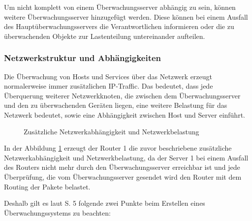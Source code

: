 Um nicht komplett von einem Überwachungsserver abhängig zu sein, können weitere Überwachungsserver hinzugefügt werden.
Diese können bei einem Ausfall des Hauptüberwachungsservers die Verantwortlichen informieren oder die zu überwachenden Objekte zur Lastenteilung untereinander aufteilen.



\subsubsection{Netzwerkstruktur und Abhängigkeiten}
Die Überwachung von Hosts und Services über das Netzwerk erzeugt normalerweise immer zusätzlichen \gls{IP}-Traffic.
Das bedeutet, dass jede Überquerung weiterer Netzwerkknoten, die zwischen dem Überwachungsserver und den zu überwachenden Geräten liegen, eine weitere Belastung für das Netzwerk bedeutet, sowie eine Abhängigkeit zwischen Host und Server einführt.
\newpage
\begin{figure}[ht]
	\centering
		\caption[Zusätzliche Netzwerkabhängigkeit und Netzwerkbelastung]{Zusätzliche Netzwerkabhängigkeit und Netzwerkbelastung}
		\label{depend}
\end{figure}

In der Abbildung \ref{depend} erzeugt der Router 1 die zuvor beschriebene zusätzliche Netzwerkabhängigkeit und Netzwerkbelastung, da der Server 1 bei einem Ausfall des Routers nicht mehr durch den Überwachungsserver erreichbar ist und jede Überprüfung, die vom Überwachungsserver gesendet wird den Router mit dem Routing der Pakete belastet.

Deshalb gilt es laut \cite{Jose07} S. 5 folgende zwei Punkte beim Erstellen eines Überwachungssystems zu beachten:

